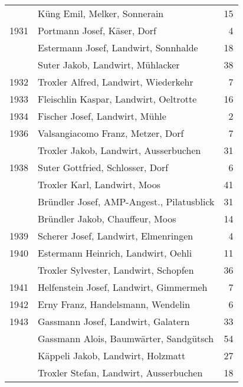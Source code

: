 {\begin{longtable}{ l l r }
                      & Küng Emil, Melker, Sonnerain              & 15          \\
        1931          & Portmann Josef, Käser, Dorf               & 4           \\
                      & Estermann Josef, Landwirt, Sonnhalde      & 18          \\
                      & Suter Jakob, Landwirt, Mühlacker          & 38          \\
        1932          & Troxler Alfred, Landwirt, Wiederkehr      & 7           \\
        1933          & Fleischlin Kaspar, Landwirt, Oeltrotte    & 16          \\
        1934          & Fischer Josef, Landwirt, Mühle            & 2           \\
        1936          & Valsangiacomo Franz, Metzer, Dorf         & 7           \\
                      & Troxler Jakob, Landwirt, Ausserbuchen     & 31          \\
        1938          & Suter Gottfried, Schlosser, Dorf          & 6           \\
                      & Troxler Karl, Landwirt, Moos              & 41          \\
                      & Bründler Josef, AMP-Angest., Pilatusblick & 31          \\
                      & Bründler Jakob, Chauffeur, Moos           & 14          \\
        1939          & Scherer Josef, Landwirt, Elmenringen      & 4           \\
        1940          & Estermann Heinrich, Landwirt, Oehli       & 11          \\
                      & Troxler Sylvester, Landwirt, Schopfen     & 36          \\
        1941          & Helfenstein Josef, Landwirt, Gimmermeh    & 7           \\
        1942          & Erny Franz, Handelsmann, Wendelin         & 6           \\
        1943          & Gassmann Josef, Landwirt, Galatern        & 33          \\
                      & Gassmann Alois, Baumwärter, Sandgütsch    & 54          \\
                      & Käppeli Jakob, Landwirt, Holzmatt         & 27          \\
                      & Troxler Stefan, Landwirt, Ausserbuchen    & 18          \\

\end{longtable}}
